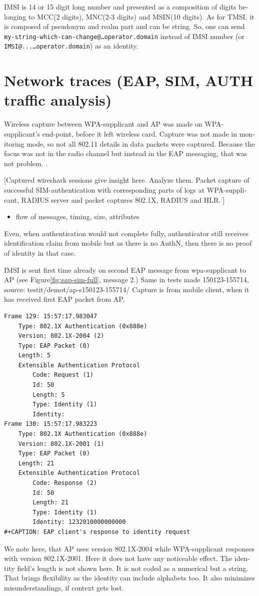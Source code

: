 \documentclass[12pt,a4paper,english]{tutthesis}
\begin{document}
\begin{otherlanguage}{english}
IMSI is 14 or 15 digit long number and presented as a composition
of digits belonging to MCC(2 digits), MNC(2-3 digits) and MSIN(10 digits).
As for TMSI, it is composed of pseudonym and realm part and can be
string. So, one can send 
\texttt{my-string-which-can-change@…operator.domain} instead of 
IMSI number (or \texttt{IMSI@...…operator.domain}) as an identity. 


\section{Network traces (EAP, SIM, AUTH traffic analysis)}
\label{sec-5-4}
Wireless capture between WPA-supplicant and AP was made on
WPA-supplicant's end-point, before it left wireless card. Capture was
not made in monitoring mode, so not all 802.11 details in
data packets were captured.
  Because the focus was not in the
radio channel but instead in the EAP messaging, that was not problem.
 \cite{wireshark-capture}.

[Captured wireshark sessions give insight here. Analyze them.
Packet capture of successful SIM-authentication with corresponding
parts of logs at WPA-supplicant, RADIUS server and packet captures 
802.1X, RADIUS and HLR. ]

\begin{itemize}
\item flow of messages,  timing,  size, attributes
\end{itemize}

Even, when authentication would not complete fully, authenticator
still receives identification claim from mobile but as there is no 
AuthN, then there is no proof of identity in that case.

IMSI is sent first time already on second EAP message from 
wpa-supplicant to AP (see Figure\ref{fig:eap-sim-full}, message 2.)
Same in tests made 150123-155714, source:
testit/demot/ap-s150123-155714/
Capture is from mobile client, when it has received first EAP
packet from AP.

\begin{verbatim}
Frame 129: 15:57:17.983047
    Type: 802.1X Authentication (0x888e)
    Version: 802.1X-2004 (2)
    Type: EAP Packet (0)
    Length: 5
    Extensible Authentication Protocol
        Code: Request (1)
        Id: 50
        Length: 5
        Type: Identity (1)
        Identity: 
Frame 130: 15:57:17.983223
    Type: 802.1X Authentication (0x888e)
    Version: 802.1X-2001 (1)
    Type: EAP Packet (0)
    Length: 21
    Extensible Authentication Protocol
        Code: Response (2)
        Id: 50
        Length: 21
        Type: Identity (1)
        Identity: 1232010000000000
#+CAPTION: EAP client's response to identity request
\end{verbatim}
We note here, that AP uses version 802.1X-2004 while WPA-supplicant responses with
version 802.1X-2001. Here it does not have any noticeable effect.
The identity field's length is not shown here.
It is not coded as a numerical but a string.
That brings flexibility as the identity can include alphabets too. It also minimizes misunderstandings,
if context gets lost.



\end{otherlanguage}
\end{document}
